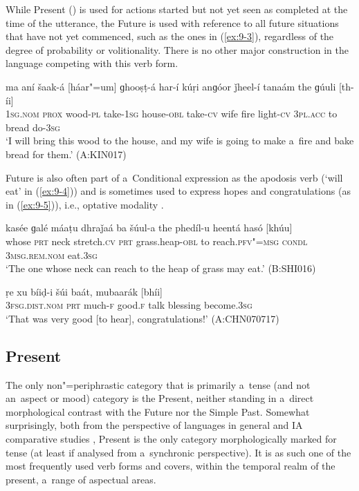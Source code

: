 While Present () is used for actions started but not yet seen as completed at the time of the utterance, the Future is used with reference to all future situations that have not yet commenced, such as the ones in (\ref{ex:9-3}), regardless of the degree of probability or volitionality. There is no other major construction in the language competing with this verb form.

\begin{exe}
\ex
\label{ex:9-3}
\gll ma aní šaak-á [háar"=um] ɡhooṣṭ-á har-í kúṛi anɡóor ǰheel-í tanaám the ɡúuli [th-íi] \\
\textsc{1sg.nom} \textsc{prox} wood-\textsc{pl} take-\textsc{1sg} house-\textsc{obl} take-\textsc{cv}  wife fire light-\textsc{cv } \textsc{3pl.acc} to bread do-\textsc{3sg} \\
\glt `I will bring this wood to the house, and my wife is going to make a~fire and bake bread for
them.' (A:KIN017)
\end{exe}

Future is also often part of a~Conditional expression as the apodosis verb (`will eat' in (\ref{ex:9-4})) and is sometimes used to express hopes and congratulations (as in (\ref{ex:9-5})), i.e., optative modality \citep[179]{bybeeetal1994}.

\begin{exe}
\ex
\label{ex:9-4}
\gll kasée ɡalé máaṭu dhraǰaá ba šúul-a the phedíl-u heentá hasó [khúu] \\
whose \textsc{prt} neck stretch.\textsc{cv} \textsc{prt} grass.heap-\textsc{obl}  to reach.\textsc{pfv"=msg } \textsc{condl} \textsc{3msg.rem.nom} eat.\textsc{3sg} \\
\glt `The one whose neck can reach to the heap of grass may eat.' (B:SHI016)

\ex
\label{ex:9-5}
\gll ṛe xu bíiḍ-i šúi baát, mubaarák [bhíi] \\
\textsc{3fsg.dist.nom} \textsc{prt} much-\textsc{f} good.\textsc{f} talk blessing  become.\textsc{3sg} \\
\glt `That was very good [to hear], congratulations!' (A:CHN070717)
\end{exe}

\subsection{Present}
\label{subsec:9-1-3}

The only non"=periphrastic category that is primarily a~tense (and not an~aspect or mood) category is the Present, neither standing in a~direct morphological contrast with the Future nor the Simple Past. Somewhat surprisingly, both from the perspective of languages in general \citep[103--128]{dahl1985} and IA comparative studies \citep[282, 288--289]{masica1991}, Present is the only category morphologically marked for tense (at least if analysed from a~synchronic perspective). It is as such one of the most frequently used verb forms and covers, within the temporal realm of the present, a~range of aspectual areas. 



